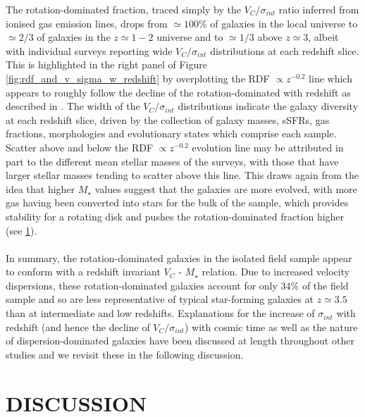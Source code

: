 \documentclass[fleqn,usenatbib]{mnras}
\begin{document}
\noindent
The rotation-dominated fraction, traced simply by the $V_{C}/\sigma_{int}$ ratio inferred from ionised gas emission lines, drops from $\simeq100\%$ of galaxies in the local universe to $\simeq2/3$ of galaxies in the $z\simeq1-2$ universe and to $\simeq1/3$ above $z\simeq3$, albeit with individual surveys reporting wide $V_{C}/\sigma_{int}$ distributions at each redshift slice.
This is highlighted in the right panel of Figure \ref{fig:rdf_and_v_sigma_w_redshift} by overplotting the RDF $\propto z^{-0.2}$ line which appears to roughly follow the decline of the rotation-dominated with redshift as described in \cite{Stott2016}. 
The width of the $V_{C}/\sigma_{int}$ distributions indicate the galaxy diversity at each redshift slice, driven by the collection of galaxy masses, sSFRs, gas fractions, morphologies and evolutionary states which comprise each sample.
Scatter above and below the RDF $\propto z^{-0.2}$ evolution line may be attributed in part to the different mean stellar masses of the surveys, with those that have larger stellar masses tending to scatter above this line.
This draws again from the idea that higher $M_{\star}$ values suggest that the galaxies are more evolved, with more gas having been converted into stars for the bulk of the sample, which provides stability for a rotating disk and pushes the rotation-dominated fraction higher (see \cref{sec:discussion}). \\\\
\noindent
In summary, the rotation-dominated galaxies in the isolated field sample appear to conform with a redshift invariant $V_{C}$ - $M_{\star}$ relation.
Due to increased velocity dispersions, these rotation-dominated galaxies account for only $34\%$ of the field sample and so are less representative of typical star-forming galaxies at $z\simeq3.5$ than at intermediate and low redshifts. 
Explanations for the increase of $\sigma_{int}$ with redshift (and hence the decline of $V_{C}/\sigma_{int}$) with cosmic time as well as the nature of dispersion-dominated galaxies have been discussed at length throughout other studies \citep[e.g][]{ForsterSchreiber2009,Law2009,Burkert2010,Newman2013,Wisnioski2015} and we revisit these in the following discussion.

\section{DISCUSSION}\label{sec:discussion}
\end{document}

